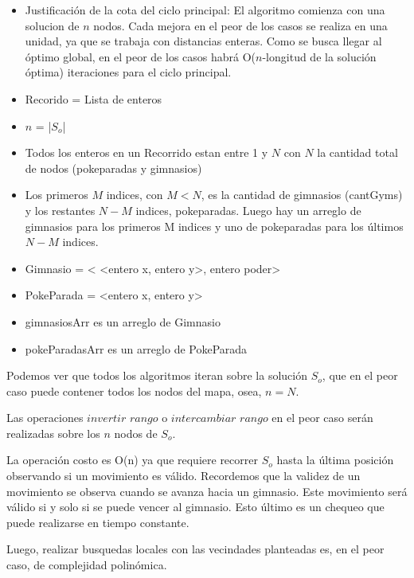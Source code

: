 \begin{algorithm}[H]


\end{algorithm}

\begin{itemize}
\item Justificación de la cota del ciclo principal: El algoritmo comienza con una solucion de $n$ nodos. Cada mejora en el peor de los casos se realiza en una unidad, ya que se trabaja con distancias enteras. Como se busca llegar al óptimo global, en el peor de los casos habrá O($n$-longitud de la solución óptima) iteraciones para el ciclo principal.
\item Recorido = Lista de enteros
\item $n$ = |$S_o$|
\item Todos los enteros en un Recorrido estan entre 1 y $N$ con $N$ la cantidad total de nodos (pokeparadas y gimnasios)
\item Los primeros $M$ indices, con $M < N$, es la cantidad de gimnasios (cantGyms) y los restantes $N-M$ indices,  pokeparadas. Luego hay un arreglo de gimnasios para los primeros M indices y uno de pokeparadas para los últimos $N-M$ indices.
\item Gimnasio = < <entero x, entero y>, entero poder>
\item PokeParada = <entero x, entero y>
\item gimnasiosArr es un arreglo de Gimnasio
\item pokeParadasArr es un arreglo de PokeParada
\end{itemize}

Podemos ver que todos los algoritmos iteran sobre la solución $S_o$, que en el peor caso puede contener todos los nodos del mapa, osea, $n = N$.

Las operaciones $invertir$ $rango$ o $intercambiar$ $rango$ en el peor caso serán realizadas sobre los $n$ nodos de $S_o$.

La operación costo es O(n) ya que requiere recorrer $S_o$ hasta la última posición observando si un movimiento es válido. Recordemos que la validez de un movimiento se observa cuando se avanza hacia un gimnasio. Este movimiento será válido si y solo si se puede vencer al gimnasio. Esto último es un chequeo que puede realizarse en tiempo constante.  

Luego, realizar busquedas locales con las vecindades planteadas es, en el peor caso, de complejidad polinómica. 


